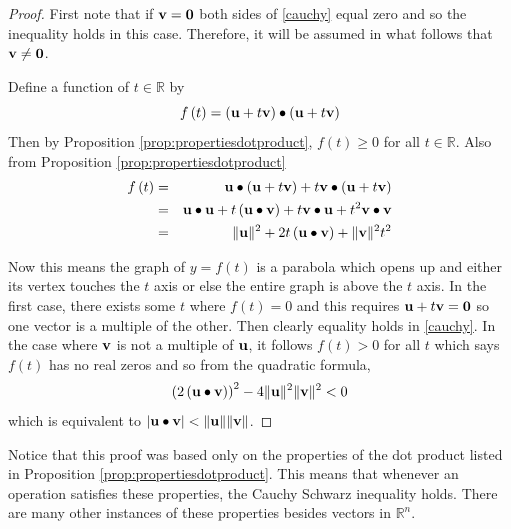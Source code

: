 \ifdefined\showproofs
\begin{proof}
First note that if $\mathbf{v}=\mathbf{0}$ both sides of \ref{cauchy}
equal zero and so the inequality holds in this case. Therefore, it will be
assumed in what follows that $\mathbf{v}\neq \mathbf{0}$.

Define a function of $t\in \mathbb{R}$ by 
\begin{equation*}
f\left( t\right) =\left( \mathbf{u}+t\mathbf{v}\right) \bullet \left( \mathbf{u}+
t\mathbf{v}\right) 
\end{equation*}
Then by Proposition \ref{prop:propertiesdotproduct}, $f\left( t\right) \geq 0$ for all $t\in \mathbb{R}$.
Also from Proposition \ref{prop:propertiesdotproduct}
\begin{eqnarray*}
f\left( t\right) &=&\mathbf{u}\bullet \left( \mathbf{u}+t\mathbf{v}\right) +
t\mathbf{v}\bullet \left( \mathbf{u}+t\mathbf{v}\right) \\
&=&\mathbf{u}\bullet \mathbf{u}+t\left( \mathbf{u}\bullet \mathbf{v}\right) + t \mathbf{v}\bullet \mathbf{u}+
t^{2}\mathbf{v}\bullet \mathbf{v} \\
&=&\| \mathbf{u}\| ^{2}+2t\left( \mathbf{u}\bullet \mathbf{v}\right) +\|
\mathbf{v}\| ^{2}t^{2}
\end{eqnarray*}

Now this means the graph of $y=f\left( t\right) $ is a parabola which opens
up and either its vertex touches the $t$ axis or else the entire graph is
above the $t$ axis. In the first case, there exists some $t$ where $f\left(
t\right) =0$ and this requires $\mathbf{u}+t\mathbf{v}=\mathbf{0}$ so one vector is a
multiple of the other. Then clearly equality holds in \ref{cauchy}. In the
case where $\mathbf{v}$ is not a multiple of $\mathbf{u}$, it follows 
$f\left( t\right) >0$ for all $t$ which says $f\left( t\right) $ has no real
zeros and so from the quadratic formula,
\begin{equation*}
\left( 2\left( \mathbf{u}\bullet \mathbf{v}\right) \right) ^{2}-4\| \mathbf{u}
\| ^{2}\| \mathbf{v}\| ^{2}<0
\end{equation*}
which is equivalent to $\left\vert \mathbf{u}\bullet \mathbf{v} \right\vert
<\| \mathbf{u}\| \| \mathbf{v}\| $.
\end{proof}
\fi
Notice that this proof was based only on the properties of
the dot product listed in Proposition \ref{prop:propertiesdotproduct}. This means that
whenever an operation satisfies these properties, the Cauchy Schwarz inequality
holds. There are many other instances of these properties besides vectors in
$\mathbb{R}^{n}$.

